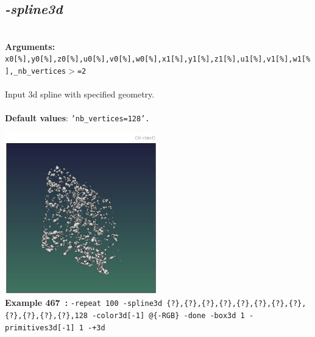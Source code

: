 \documentclass[a4paper,11pt,twoside]{book}
\begin{document}
\subsection{\emph{-spline3d} }\vspace*{-0.5em}
~\\\textbf{Arguments: } 
{\small \texttt{x0[\%],y0[\%],z0[\%],u0[\%],v0[\%],w0[\%],x1[\%],y1[\%],z1[\%],u1[\%],v1[\%],w1[\%],\_nb\_vertices$>$=2}}\\~\\
Input 3d spline with specified geometry.
~\\~\\\textbf{Default values}: {\small \texttt{'nb\_vertices=128'.}}
\begin{center}\includegraphics[keepaspectratio=true,height=7cm,width=\textwidth]{img/gmic_def467.jpg}\\
{\footnotesize \textbf{Example 467~:} \texttt{-repeat 100 -spline3d \{?\},\{?\},\{?\},\{?\},\{?\},\{?\},\{?\},\{?\},\{?\},\{?\},\{?\},\{?\},128 -color3d[-1] @\{-RGB\} -done -box3d 1 -primitives3d[-1] 1 -+3d}}
\end{center}
\end{document}
